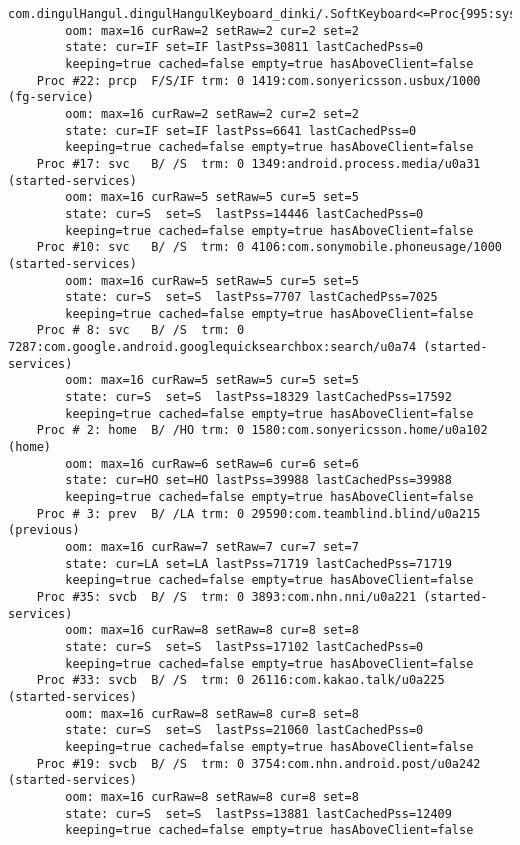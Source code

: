 \begin{lstlisting}[frame=single]
        com.dingulHangul.dingulHangulKeyboard_dinki/.SoftKeyboard<=Proc{995:system/1000}
        oom: max=16 curRaw=2 setRaw=2 cur=2 set=2
        state: cur=IF set=IF lastPss=30811 lastCachedPss=0
        keeping=true cached=false empty=true hasAboveClient=false
    Proc #22: prcp  F/S/IF trm: 0 1419:com.sonyericsson.usbux/1000 (fg-service)
        oom: max=16 curRaw=2 setRaw=2 cur=2 set=2
        state: cur=IF set=IF lastPss=6641 lastCachedPss=0
        keeping=true cached=false empty=true hasAboveClient=false
    Proc #17: svc   B/ /S  trm: 0 1349:android.process.media/u0a31 (started-services)
        oom: max=16 curRaw=5 setRaw=5 cur=5 set=5
        state: cur=S  set=S  lastPss=14446 lastCachedPss=0
        keeping=true cached=false empty=true hasAboveClient=false
    Proc #10: svc   B/ /S  trm: 0 4106:com.sonymobile.phoneusage/1000 (started-services)
        oom: max=16 curRaw=5 setRaw=5 cur=5 set=5
        state: cur=S  set=S  lastPss=7707 lastCachedPss=7025
        keeping=true cached=false empty=true hasAboveClient=false
    Proc # 8: svc   B/ /S  trm: 0 7287:com.google.android.googlequicksearchbox:search/u0a74 (started-services)
        oom: max=16 curRaw=5 setRaw=5 cur=5 set=5
        state: cur=S  set=S  lastPss=18329 lastCachedPss=17592
        keeping=true cached=false empty=true hasAboveClient=false
    Proc # 2: home  B/ /HO trm: 0 1580:com.sonyericsson.home/u0a102 (home)
        oom: max=16 curRaw=6 setRaw=6 cur=6 set=6
        state: cur=HO set=HO lastPss=39988 lastCachedPss=39988
        keeping=true cached=false empty=true hasAboveClient=false
    Proc # 3: prev  B/ /LA trm: 0 29590:com.teamblind.blind/u0a215 (previous)
        oom: max=16 curRaw=7 setRaw=7 cur=7 set=7
        state: cur=LA set=LA lastPss=71719 lastCachedPss=71719
        keeping=true cached=false empty=true hasAboveClient=false
    Proc #35: svcb  B/ /S  trm: 0 3893:com.nhn.nni/u0a221 (started-services)
        oom: max=16 curRaw=8 setRaw=8 cur=8 set=8
        state: cur=S  set=S  lastPss=17102 lastCachedPss=0
        keeping=true cached=false empty=true hasAboveClient=false
    Proc #33: svcb  B/ /S  trm: 0 26116:com.kakao.talk/u0a225 (started-services)
        oom: max=16 curRaw=8 setRaw=8 cur=8 set=8
        state: cur=S  set=S  lastPss=21060 lastCachedPss=0
        keeping=true cached=false empty=true hasAboveClient=false
    Proc #19: svcb  B/ /S  trm: 0 3754:com.nhn.android.post/u0a242 (started-services)
        oom: max=16 curRaw=8 setRaw=8 cur=8 set=8
        state: cur=S  set=S  lastPss=13881 lastCachedPss=12409
        keeping=true cached=false empty=true hasAboveClient=false

\end{lstlisting}
